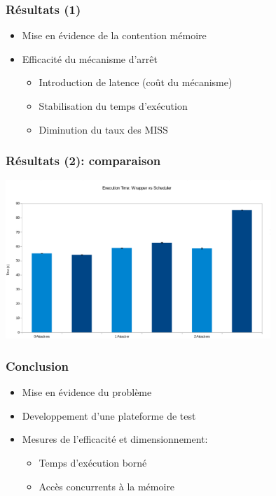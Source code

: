 \documentclass{beamer}
\begin{document}
    \begin{frame}[label=resultats]
        \frametitle{Résultats (1)}
        \begin{itemize}
            \item Mise en évidence de la contention mémoire
            \item Efficacité du mécanisme d'arrêt
                \begin{itemize}
                    \item Introduction de latence (coût du mécanisme)
                    \item Stabilisation du temps d'exécution
                    \item Diminution du taux des MISS
                \end{itemize}
        \end{itemize}
    \end{frame}

    \begin{frame}[label=wrapper_vs_scheduler]
        \frametitle{Résultats (2): comparaison}
        \includegraphics[width=10cm]{doc/graphes/benchmark_1_performance.eps}
    \end{frame}

    \begin{frame}[label=conclusion]
        \frametitle{Conclusion}
        \begin{itemize}
            \item Mise en évidence du problème
            \item Developpement d'une plateforme de test
            \item Mesures de l'efficacité et dimensionnement:
                \begin{itemize}
                    \item Temps d'exécution borné
                    \item Accès concurrents à la mémoire
                \end{itemize}
        \end{itemize}
    \end{frame}
\end{document}
